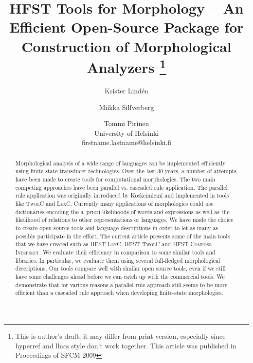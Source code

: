 \documentclass[a4paper]{article}
\begin{document}
\ifpdf
{}
\fi
\title{\textsc{HFST} Tools for Morphology -- An Efficient Open-Source
Package for Construction of Morphological Analyzers
\footnote{This is author's draft; it may differ from print version, especially
since hyperref and llncs style don't work together.
This article was published in Proceedings of SFCM 2009}
}

\author{ Krister Lindén \and Miikka Silfverberg \and Tommi Pirinen \\ %
%
University of Helsinki\\
            firstname.lastname@helsinki.fi\\
            }

\maketitle

\begin{abstract}
Morphological analysis of a wide range of languages can be implemented
efficiently using finite-state transducer technologies. Over the last
30 years, a number of attempts have been made to create tools for
computational morphologies. The two main competing approaches have
been parallel vs. cascaded rule application. The parallel rule
application was originally introduced by Koskenniemi
\cite{Koskenniemi83} and implemented in tools like \textsc{TwolC} and
\textsc{LexC}. Currently many applications of morphologies could use
dictionaries encoding the a~priori likelihoods of words and
expressions as well as the likelihood of relations to other
representations or languages. We have made the choice to create
open-source tools and language descriptions in order to let as many as
possible participate in the effort. The current article presents some
of the main tools that we have created such as \textsc{HFST-LexC},
\textsc{HFST-TwolC} and \textsc{HFST-Compose-Intersect}.  We evaluate
their efficiency in comparison to some similar tools and libraries. In
particular, we evaluate them using several full-fledged morphological
descriptions. Our tools compare well with similar open source tools,
even if we still have some challenges ahead before we can catch up
with the commercial tools. We demonstrate that for various reasons a
parallel rule approach still seems to be more efficient than a
cascaded rule approach when developing finite-state morphologies.
\end{abstract}
\end{document}
